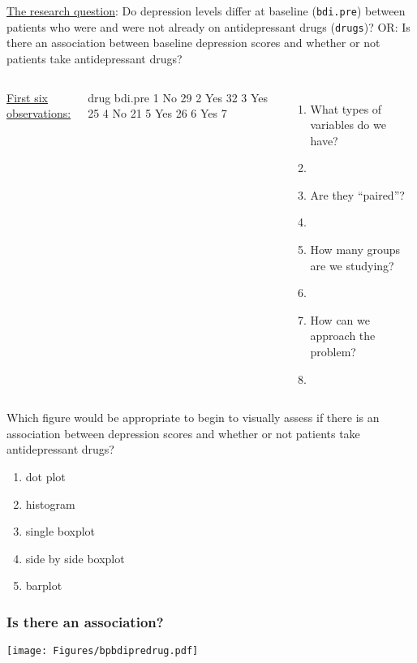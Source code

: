 \begin{frame}[fragile]
\underline{The research question}: Do depression levels differ at baseline (\texttt{bdi.pre}) between patients who were and were not already on antidepressant drugs (\texttt{drugs})?  OR: Is there an association between baseline depression scores and whether or not patients take antidepressant drugs?
\vskip10pt
\begin{columns}
\underline{First six observations:}
\begin{lcverbatim}
  drug bdi.pre
1   No      29
2  Yes      32
3  Yes      25
4   No      21
5  Yes      26
6  Yes       7
\end{lcverbatim}
\begin{enumerate}
\item
What types of variables do we have?
\item[]
\item
Are they ``paired''?
\item[]
\item
How many groups are we studying?
\item[]
\item
How can we approach the problem?
\item[]
\end{enumerate}
\end{columns}
\end{frame}




\begin{frame}
\begin{clicker}{Which figure would be appropriate to begin to visually assess if there is an association between depression scores and whether or not patients take antidepressant drugs?}
\begin{enumerate}
    \item
    dot plot
    \item
    histogram
    \item
    single boxplot
    \item
    side by side boxplot
    \item
    barplot
\end{enumerate}
\end{clicker}
\end{frame}

\begin{frame}
\frametitle{Is there an association?}
\begin{center}
\texttt{[image: Figures/bpbdipredrug.pdf]}
\end{center}
\end{frame}


